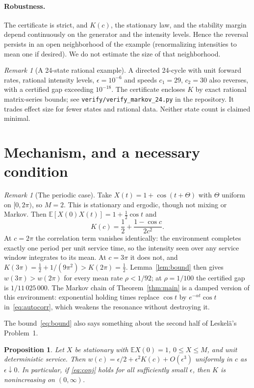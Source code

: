 \documentclass[11pt]{article}
\newcommand{\E}{\mathbb{E}}
\newcommand{\eps}{\epsilon}
\newtheorem{proposition}[theorem]{Proposition}
\theoremstyle{remark}
\newtheorem{remark}[theorem]{Remark}
\begin{document}
\paragraph{Robustness.} The certificate is strict, and $K(c)$, the stationary law, and the stability margin depend continuously on the generator and the intensity levels. Hence the reversal persists in an open neighborhood of the example (renormalizing intensities to mean one if desired). We do not estimate the size of that neighborhood.

\begin{remark}[A 24-state rational example]
A directed 24-cycle with unit forward rates, rational intensity levels, $\eps=10^{-6}$ and speeds $c_1=29$, $c_2=30$ also reverses, with a certified gap exceeding $10^{-18}$. The certificate encloses $K$ by exact rational matrix-series bounds; see \texttt{verify/verify\_markov\_24.py} in the repository. It trades effect size for fewer states and rational data. Neither state count is claimed minimal.
\end{remark}

\section{Mechanism, and a necessary condition}\label{sec:mechanism}

\begin{remark}[The periodic case]\label{rem:periodic}
Take $X(t)=1+\cos(t+\Theta)$ with $\Theta$ uniform on $[0,2\pi)$, so $M=2$. This is stationary and ergodic, though not mixing or Markov. Then $\E[X(0)X(t)]=1+\tfrac12\cos t$ and
\[
K(c)=\frac12+\frac{1-\cos c}{2c^2}.
\]
At $c=2\pi$ the correlation term vanishes identically: the environment completes exactly one period per unit service time, so the intensity seen over any service window integrates to its mean. At $c=3\pi$ it does not, and $K(3\pi)=\tfrac12+1/(9\pi^2)>K(2\pi)=\tfrac12$. Lemma~\ref{lem:bound} then gives $w(3\pi)>w(2\pi)$ for every mean rate $\rho<1/92$; at $\rho=1/100$ the certified gap is $1/11\,025\,000$. The Markov chain of Theorem~\ref{thm:main} is a damped version of this environment: exponential holding times replace $\cos t$ by $e^{-\alpha t}\cos t$ in~\eqref{eq:autocorr}, which weakens the resonance without destroying it.
\end{remark}

The bound~\eqref{eq:bound} also says something about the second half of Leskel\"a's Problem~1.

\begin{proposition}\label{prop:necessary}
Let $X$ be stationary with $\E X(0)=1$, $0\le X\le M$, and unit deterministic service. Then $w(c)=\eps/2+\eps^2K(c)+O(\eps^3)$ uniformly in $c$ as $\eps\downarrow0$. In particular, if \eqref{eq:conj} holds for all sufficiently small $\eps$, then $K$ is nonincreasing on $(0,\infty)$.
\end{proposition}
\end{document}
